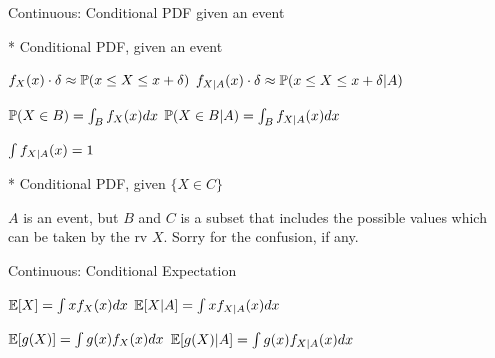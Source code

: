 \begin{frame}{Continuous:  Conditional PDF given an event}

{
* Conditional PDF, given an event

\medskip

\plitemsep 0.15in
\bci
\item<2-> $f_X(x) \cdot \delta \approx \mathbb{P}( x \le X \le x+\delta )$
$f_{X|A}(x) \cdot \delta \approx \mathbb{P}( x \le X \le x+\delta | A )$

\item<3-> $\mathbb{P}( X \in B ) = \int_B f_X(x) dx$
$\mathbb{P}( X \in B | A ) = \int_B f_{X|A}(x) dx$



\item<4-> $\int f_{X|A}(x) = 1$
\eci
}
{
* Conditional PDF, given $\{X \in C \}$

\medskip



}

 $A$ is an event, but $B$ and $C$ is a subset that includes the possible values which can be taken by the rv $X.$ Sorry for the confusion, if any.


\end{frame}

\begin{frame}{Continuous:  Conditional Expectation}

{
\plitemsep 0.15in



\vspace{-0.3cm}
\vspace{-0.5cm}
\vspace{-0.5cm}

}
{
\bci
\item<3-> $\mathbb{E}[ X ] = \int xf_X(x) dx$
$\mathbb{E}[ X | A ] = \int xf_{X|A}(x) dx$

\item<4-> $\mathbb{E}[ g(X) ] = \int g(x)f_X(x) dx$
$\mathbb{E}[ g(X) | A ] = \int g(x)f_{X|A}(x) dx$
\eci

}
\end{frame}

